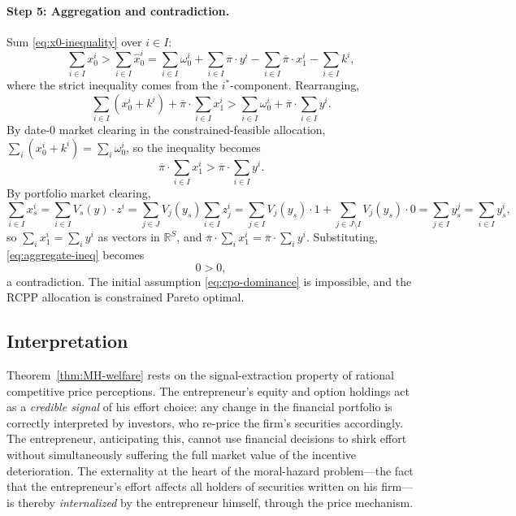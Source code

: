 \documentclass[11pt,a4paper,oneside]{book}
\def\R{\mathbb{R}}
\theoremstyle{plain}
\theoremstyle{definition}
\theoremstyle{remark}
\numberwithin{equation}{chapter}
\begin{document}
\paragraph{Step 5: Aggregation and contradiction.}
Sum \eqref{eq:x0-inequality} over $i \in I$:
\begin{equation*}
  \sum_{i \in I} x^i_0
  > \sum_{i \in I} \widehat{x}^i_0
  = \sum_{i \in I} \omega^i_0 + \sum_{i \in I} \overline{\pi} \cdot y^i - \sum_{i \in I} \overline{\pi} \cdot x^i_1 - \sum_{i \in I} k^i,
\end{equation*}
where the strict inequality comes from the $i^\ast$-component.
Rearranging,
\begin{equation}\label{eq:aggregate-ineq}
  \sum_{i \in I} (x^i_0 + k^i) + \overline{\pi} \cdot \sum_{i \in I} x^i_1
  > \sum_{i \in I} \omega^i_0 + \overline{\pi} \cdot \sum_{i \in I} y^i.
\end{equation}
By date-$0$ market clearing in the constrained-feasible allocation, $\sum_i (x^i_0 + k^i) = \sum_i \omega^i_0$, so the inequality becomes
\begin{equation*}
  \overline{\pi} \cdot \sum_{i \in I} x^i_1
  > \overline{\pi} \cdot \sum_{i \in I} y^i.
\end{equation*}
By portfolio market clearing,
\begin{equation*}
  \sum_{i \in I} x^i_s = \sum_{i \in I} V_s(y) \cdot z^i
  = \sum_{j \in J} V_j(y_s) \sum_{i \in I} z^i_j
  = \sum_{j \in I} V_j(y_s) \cdot 1 + \sum_{j \in J \setminus I} V_j(y_s) \cdot 0
  = \sum_{j \in I} y^j_s
  = \sum_{i \in I} y^i_s,
\end{equation*}
so $\sum_i x^i_1 = \sum_i y^i$ as vectors in $\R^S$, and $\overline{\pi} \cdot \sum_i x^i_1 = \overline{\pi} \cdot \sum_i y^i$.
Substituting, \eqref{eq:aggregate-ineq} becomes
\begin{equation*}
  0 > 0,
\end{equation*}
a contradiction.
The initial assumption \eqref{eq:cpo-dominance} is impossible, and the RCPP allocation is constrained Pareto optimal.
\hfill\qedsymbol

\subsection{Interpretation}

Theorem~\ref{thm:MH-welfare} rests on the signal-extraction property of rational competitive price perceptions.
The entrepreneur's equity and option holdings act as a \emph{credible signal} of his effort choice: any change in the financial portfolio is correctly interpreted by investors, who re-price the firm's securities accordingly.
The entrepreneur, anticipating this, cannot use financial decisions to shirk effort without simultaneously suffering the full market value of the incentive deterioration.
The externality at the heart of the moral-hazard problem---the fact that the entrepreneur's effort affects all holders of securities written on his firm---is thereby \emph{internalized} by the entrepreneur himself, through the price mechanism.
\end{document}
